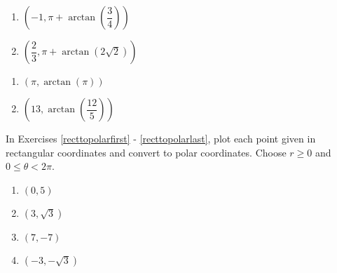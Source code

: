 \documentclass{ximera}
\begin{document}
\begin{multicols}{2} 

\begin{enumerate}

\setcounter{enumi}{\value{HW}}

\item $\left( -1, \pi + \arctan\left(\dfrac{3}{4}\right) \right)$ 
\item $\left( \dfrac{2}{3}, \pi + \arctan\left(2\sqrt{2}\right) \right)$

\setcounter{HW}{\value{enumi}}

\end{enumerate}

\end{multicols}

\begin{multicols}{2} 

\begin{enumerate}

\setcounter{enumi}{\value{HW}}

\item $\left( \pi, \arctan(\pi) \right)$ 
\item $\left( 13, \arctan \left( \dfrac{12}{5} \right) \right)$ \label{polartorectlast}

\setcounter{HW}{\value{enumi}}

\end{enumerate}

\end{multicols}

In Exercises \ref{recttopolarfirst} - \ref{recttopolarlast}, plot each point given in rectangular coordinates and convert to polar coordinates.  Choose $r \geq 0$ and $0 \leq \theta < 2\pi$.  

\begin{multicols}{4}

\begin{enumerate}

\setcounter{enumi}{\value{HW}}

\item $(0, 5)$ \label{recttopolarfirst} 
\item $(3, \sqrt{3})$
\item $(7, -7)$
\item $(-3, -\sqrt{3})$

\setcounter{HW}{\value{enumi}}

\end{enumerate}

\end{multicols}
\end{document}
